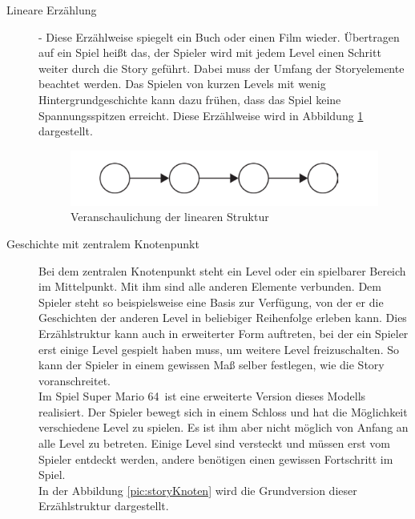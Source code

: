 \begin{description} 
\item[Lineare Erzählung]  - Diese Erzählweise spiegelt ein Buch oder einen Film wieder. Übertragen auf ein Spiel heißt das, der Spieler wird mit jedem Level einen Schritt weiter durch die Story geführt. Dabei muss der Umfang der Storyelemente beachtet werden. Das Spielen von kurzen Levels mit wenig Hintergrundgeschichte kann dazu frühen, dass das Spiel keine Spannungsspitzen erreicht. Diese Erzählweise wird in Abbildung \ref{pic:storyLinear} dargestellt. %
\cite[S. 98]{Adams:1515529}


\begin{figure}[H]
    \centering
    \includegraphics[width=.8\textwidth]{files/story/storyLinear}
    \caption{Veranschaulichung der linearen Struktur \cite[S. 98]{Adams:1515529}}
    \label{pic:storyLinear}
\end{figure}
 
\item[Geschichte mit zentralem Knotenpunkt] 
Bei dem zentralen Knotenpunkt steht ein Level oder ein spielbarer Bereich im Mittelpunkt. Mit ihm sind alle anderen Elemente verbunden. Dem Spieler steht so beispielsweise eine Basis zur Verfügung, von der er die Geschichten der anderen Level in beliebiger Reihenfolge erleben kann. Dies Erzählstruktur kann auch in erweiterter Form auftreten, bei der ein Spieler erst einige Level gespielt haben muss, um weitere Level freizuschalten. So kann der Spieler in einem gewissen Maß selber festlegen, wie die Story voranschreitet. \cite[S. 98f.]{Adams:1515529} \\
Im Spiel \glqq Super Mario 64\grqq\ ist eine erweiterte Version dieses Modells realisiert. Der Spieler bewegt sich in einem Schloss und hat die Möglichkeit verschiedene Level zu spielen. Es ist ihm aber nicht möglich von Anfang an alle Level zu betreten. Einige Level sind versteckt und müssen erst vom Spieler entdeckt werden, andere benötigen einen gewissen Fortschritt im Spiel.\\ %
In der Abbildung \ref{pic:storyKnoten} wird die Grundversion dieser Erzählstruktur dargestellt.



\end{description}
